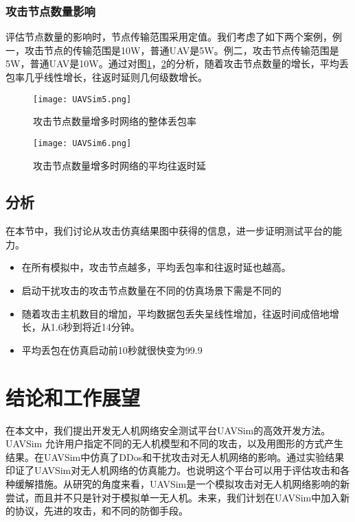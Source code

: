 \documentclass[bachelor,fontset=fandol,AutoFakeBold=true]{nuaathesis}
\begin{document}
        \subsection{攻击节点数量影响}
        评估节点数量的影响时，节点传输范围采用定值。我们考虑了如下两个案例，例一，攻击节点的传输范围是10W，普通UAV是5W。例二，攻击节点传输范围是5W，普通UAV是10W。通过对图\ref{fig6}，\ref{fig7}的分析，随着攻击节点数量的增长，平均丢包率几乎线性增长，往返时延则几何级数增长。
        \begin{figure}[]
	        \centering          	
            \texttt{[image: UAVSim5.png]}  
        \caption{攻击节点数量增多时网络的整体丢包率} \label{fig6}
        \end{figure}
        \begin{figure}[]
	        \centering          	
            \texttt{[image: UAVSim6.png]}  
        \caption{攻击节点数量增多时网络的平均往返时延} \label{fig7}
        \end{figure}
    \section{分析}
    在本节中，我们讨论从攻击仿真结果图中获得的信息，进一步证明测试平台的能力。
    \begin{itemize}
        \item 在所有模拟中，攻击节点越多，平均丢包率和往返时延也越高。
        \item 启动干扰攻击的攻击节点数量在不同的仿真场景下需是不同的
        \item 随着攻击主机数目的增加，平均数据包丢失呈线性增加，往返时间成倍地增长，从1.6秒到将近14分钟。
        \item 平均丢包在仿真启动前10秒就很快变为99.9%
    \end{itemize}
\chapter{结论和工作展望}
在本文中，我们提出开发无人机网络安全测试平台UAVSim的高效开发方法。UAVSim 允许用户指定不同的无人机模型和不同的攻击，以及用图形的方式产生结果。在UAVSim中仿真了DDos和干扰攻击对无人机网络的影响。通过实验结果印证了UAVSim对无人机网络的仿真能力。也说明这个平台可以用于评估攻击和各种缓解措施。从研究的角度来看，UAVSim是一个模拟攻击对无人机网络影响的新尝试，而且并不只是针对于模拟单一无人机。未来，我们计划在UAVSim中加入新的协议，先进的攻击，和不同的防御手段。

\backmatter                             %
\printbibliography[heading=bibintoc]
\end{document}
